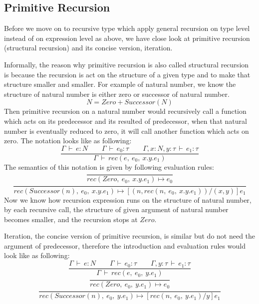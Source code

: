 \documentclass{article}
\begin{document}
\subsection*{Primitive Recursion}
Before we move on to recursive type which apply general recursion on type level instead of on expression level as above, we have close look at primitive recursion (structural recursion) and its concise version, iteration.


Informally, the reason why primitive recursion is also called structural recursion is because the recursion is act on the structure of a given type and to make that structure smaller and smaller. For example of natural number, we know the structure of natural number is either zero or successor of natural number.
\begin{equation*}
N = Zero + Successor(N)
\end{equation*}
Then primitive recursion on a natural number would recursively call a function which acts on its predecessor and its resulted of predecessor, when that natural number is eventually reduced to zero, it will call another function which acts on zero. The notation looks like as following:
\begin{equation*}
\frac{\Gamma\,\vdash\,e:N\qquad \Gamma\,\vdash\,e_{0}:\tau\qquad\Gamma, x:N, y:\tau\,\vdash\,e_{1}:\tau}
{\Gamma\,\vdash\,rec(e,\ e_{0},\ x.y.e_{1})}
\end{equation*}
The semantics of this notation is given by following evaluation rules:
\begin{equation*}
\frac{}
{rec(Zero,\ e_{0},\ x.y.e_{1}) \mapsto e_{0}}
\end{equation*}
\begin{equation*}
\frac{}
{rec(Successor(n),\ e_{0},\ x.y.e_{1}) \mapsto [(n, rec(n,\ e_{0},\ x.y.e_{1}))/(x,y)]e_{1}}
\end{equation*}
Now we know how recursion expression runs on the structure of natural number, by each recursive call, the structure of given argument of natural number becomes smaller, and the recursion stops at $Zero$.


Iteration, the concise version of primitive recursion, is similar but do not need the argument of predecessor, therefore the introduction and evaluation rules would look like as following:
\begin{equation*}
\frac{\Gamma\,\vdash\,e:N\qquad \Gamma\,\vdash\,e_{0}:\tau\qquad\Gamma, y:\tau\,\vdash\,e_{1}:\tau}
{\Gamma\,\vdash\,rec(e,\ e_{0},\ y.e_{1})}
\end{equation*}
\begin{equation*}
\frac{}
{rec(Zero,\ e_{0},\ y.e_{1}) \mapsto e_{0}}
\end{equation*}
\begin{equation*}
\frac{}
{rec(Successor(n),\ e_{0},\ y.e_{1}) \mapsto [rec(n,\ e_{0},\ y.e_{1})/y]e_{1}}
\end{equation*}
\end{document}
